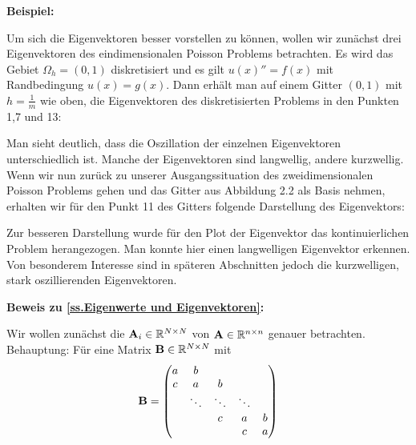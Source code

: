 \textbf{Beispiel:}

Um sich die Eigenvektoren besser vorstellen zu können, wollen wir zunächst drei Eigenvektoren des eindimensionalen Poisson Problems betrachten. Es wird das Gebiet $\Omega_{h} = (0,1)$ diskretisiert und es gilt $u(x)'' = f(x)$ mit Randbedingung $u(x) = g(x)$. Dann erhält man auf einem Gitter $(0,1)$ mit $h = \frac{1}{m}$ wie oben, die Eigenvektoren des diskretisierten Problems in den Punkten 1,7 und 13:

\label{img.1D Langwelle}



Man sieht deutlich, dass die Oszillation der einzelnen Eigenvektoren unterschiedlich ist. Manche der Eigenvektoren sind langwellig, andere kurzwellig. Wenn wir nun zurück zu unserer Ausgangssituation des zweidimensionalen Poisson Problems gehen und das Gitter aus Abbildung 2.2 als Basis nehmen, erhalten wir für den Punkt 11 des Gitters folgende Darstellung des Eigenvektors:


Zur besseren Darstellung wurde für den Plot der Eigenvektor das kontinuierlichen Problem herangezogen. Man konnte hier einen langwelligen Eigenvektor erkennen. Von besonderem Interesse sind in späteren Abschnitten jedoch die kurzwelligen, stark oszillierenden Eigenvektoren.

\textbf{Beweis zu \autoref{ss.Eigenwerte und Eigenvektoren}:}

Wir wollen zunächst die ${\textbf{A}}_{i} \in \mathbb{R}^{N \times N}$ von ${\textbf{A}} \in \mathbb{R}^{n \times n}$ genauer betrachten.\\
Behauptung: Für eine Matrix ${\textbf{B}} \in \mathbb{R}^{N \times N}$ mit
\begin{equation}
{\textbf{B}} = 
\begin{pmatrix}
a & b\\
c & a & b\\
  & \ddots & \ddots & \ddots\\
  &		   & c & a & b\\
  &		   &  & c & a
\end{pmatrix}
\end{equation}

